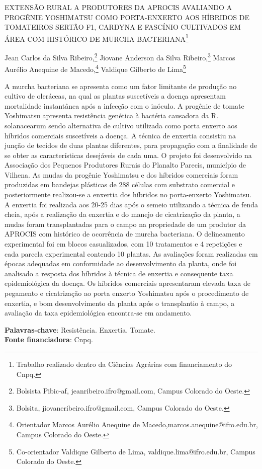 \documentclass[article,12pt,onesidea,4paper,english,brazil]{abntex2}
\begin{document}
	
	
	\frenchspacing 
	
	\begin{center}
		\LARGE EXTENSÃO RURAL A PRODUTORES DA APROCIS AVALIANDO A PROGÊNIE YOSHIMATSU COMO PORTA-ENXERTO AOS HÍBRIDOS DE TOMATEIROS SERTÃO F1, CARDYNA E FASCÍNIO CULTIVADOS EM ÁREA COM HISTÓRICO DE MURCHA BACTERIANA\footnote{Trabalho realizado dentro da Ciências Agrárias com financiamento do Cnpq.}
		
		\normalsize
		Jean Carlos da Silva Ribeiro,\footnote{Bolsista Pibic-af, jeanribeiro.ifro@gmail.com, Campus Colorado do Oeste.} 
	Jiovane Anderson da Silva Ribeiro,\footnote{Bolsita, jiovaneribeiro.ifro@gmail.com, Campus Colorado do Oeste.} 
		Marcos Aurélio Anequine de Macedo,\footnote{Orientador Marcos Aurélio Anequine de Macedo,marcos.anequine@ifro.edu.br, Campus Colorado do Oeste.} 
		Valdique Gilberto de Lima\footnote{Co-orientador Valdique Gilberto de Lima, valdique.lima@ifro.edu.br, Campus Colorado do Oeste.} 
	\end{center}
	
	\noindent A murcha bacteriana se apresenta como um fator limitante de produção no cultivo de oleráceas, na qual as plantas suscetíveis a doença apresentam mortalidade instantânea após a infecção com o inóculo. A progênie de tomate Yoshimatsu apresenta resistência genética à bactéria causadora da R. solanacearum sendo alternativa de cultivo utilizada como porta enxerto aos híbridos comerciais suscetíveis a doença. A técnica de enxertia consistiu na junção de tecidos de duas plantas diferentes, para propagação com a finalidade de se obter as características desejáveis de cada uma. O projeto foi desenvolvido na Associação dos Pequenos Produtores Rurais do Planalto Parecis, município de Vilhena. As mudas da progênie Yoshimatsu e dos híbridos comerciais foram produzidas em bandejas plásticas de 288 células com substrato comercial e posteriormente realizou-se a enxertia dos híbridos no porta-enxerto Yoshimatsu. A enxertia foi realizada aos 20-25 dias após o semeio utilizando a técnica de fenda cheia, após a realização da enxertia e do manejo de cicatrização da planta, a mudas foram transplantadas para o campo na propriedade de um produtor da APROCIS com histórico de ocorrência de murcha bacteriana. O delineamento experimental foi em blocos casualizados, com 10 tratamentos e 4 repetições e cada parcela experimental contendo 10 plantas. As avaliações foram realizadas em épocas adequadas em conformidade ao desenvolvimento da planta, onde foi analisado a resposta dos híbridos à técnica de enxertia e consequente taxa epidemiológica da doença. Os híbridos comerciais apresentaram elevada taxa de pegamento e cicatrização ao porta enxerto Yoshimatsu após o procedimento de enxertia, e bom desenvolvimento da planta após o transplantio à campo, a avaliação da taxa epidemiológica encontra-se em andamento.
	
	\vspace{\onelineskip}
	
	\noindent
	\textbf{Palavras-chave}: Resistência. Enxertia. Tomate.\\
	\textbf{Fonte financiadora}: Cnpq. 
\end{document}
